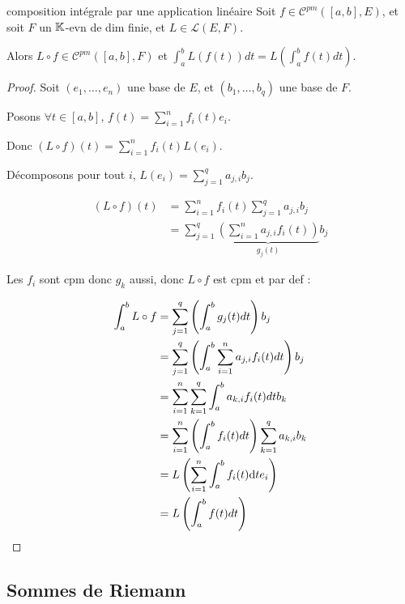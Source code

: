\begin{theoreme}{composition intégrale par une application linéaire}{}
    Soit $f \in \mathscr C^{pm}([a, b], E)$, et soit $F$ un $\mathbb{K}$-evn de dim finie, et 
    $L \in \mathscr L(E, F)$.

    Alors $L \circ f \in \mathscr C^{pm}([a, b], F)$ et $\displaystyle \int_a^b L(f(t)) dt = L\left( \int_a^b f(t) dt \right)$.
\end{theoreme}


\begin{proof}
    Soit $(e_1, \ldots, e_n)$ une base de $E$, et $(b_1, \ldots, b_q)$ une base de $F$.

    Posons $\displaystyle \forall t \in [a, b], \, f(t) = \sum_{i=1}^n f_i(t)e_i$.

    Donc $\displaystyle (L \circ f)(t) = \sum_{i=1}^n f_i(t)L(e_i)$.

    Décomposons pour tout $i$, $\displaystyle L(e_i) = \sum_{j=1}^q a_{j, i} b_j$.

    \begin{align*}
        (L \circ f) (t) & = \sum_{i=1}^n f_i(t) \sum_{j=1}^q a_{j, i} b_j \\
        & = \sum_{j=1}^q \underbrace{\left( \sum_{i=1}^n a_{j, i} f_i(t) \right)}_{g_j(t)} b_j
    \end{align*}

    Les $f_i$ sont cpm donc $g_k$ aussi, donc $L \circ f$ est cpm et par def : 

    \begin{align*}
        \int_a^b L \circ f & = \sum_{j=1}^q \left( \int_a^b g_j(t) dt \right) b_j \\
        & = \sum_{j=1}^q \left( \int_a^b \sum_{i=1}^n a_{j, i} f_i(t) dt \right) b_j \\
        & = \sum_{i = 1}^n \sum_{k = 1 }^{q } \int_{a }^{b } a_{k, i} f_i(t) dt b_k \\
        & = \sum_{i=1}^n \left( \int_a^b f_i(t) dt \right) \sum_{k=1}^q a_{k, i} b_k \\
        & = L \left( \sum_{i = 1 }^{n } \int_{a }^{b } f_i(t) \text d t e_i \right) \\
        & = L \left( \int_a^b f(t) dt \right)
    \end{align*}
\end{proof}

\subsection{Sommes de Riemann}

